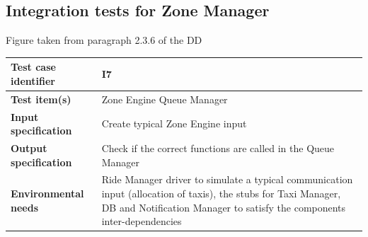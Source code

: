 \documentclass[a4paper,11pt]{report} %
\begin{document}
		\subsection{Integration tests for Zone Manager}
		\begin{minipage}{\linewidth}
		\end{minipage}
		\begin{center}
			Figure taken from paragraph 2.3.6 of the DD
		\end{center} 
		\begin{center}
			\renewcommand{\arraystretch}{1.2}
			\setlength{\tabcolsep}{24pt}
			\begin{tabular}{ l  p{9cm}}\hline
				\textbf{Test case identifier} & I7\\\hline
				\textbf{Test item(s)} & Zone Engine \textrightarrow Queue Manager\\\hline
				\textbf{Input specification} & Create typical Zone Engine input \\\hline
				\textbf{Output specification} & Check if the correct functions are called in the Queue Manager\\\hline
				\textbf{Environmental needs} & Ride Manager driver to simulate a typical communication input (allocation of taxis), the stubs for Taxi Manager, DB and Notification Manager to satisfy the components inter-dependencies\\\hline
			\end{tabular}
		\end{center}	
		
\end{document}
